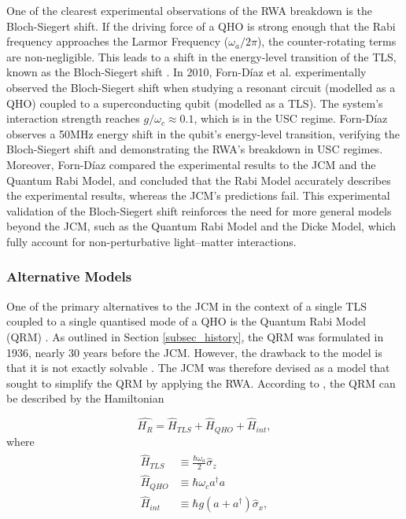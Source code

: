 \documentclass[12pt,a4paper]{article}
\begin{document}
One of the clearest experimental observations of the RWA breakdown is the Bloch-Siegert shift. If the driving force of a QHO is strong enough that the Rabi frequency approaches the Larmor Frequency ($\omega_a/2\pi$), the counter-rotating terms are non-negligible. This leads to a shift in the energy-level transition of the TLS, known as the Bloch-Siegert shift \cite{Context2010-Bloch_Siegert}. In 2010, Forn-D\'iaz et al. experimentally observed the Bloch-Siegert shift when studying a resonant circuit (modelled as a QHO) coupled to a superconducting qubit (modelled as a TLS). The system's interaction strength reaches $g/\omega_c \approx 0.1$, which is in the USC regime. Forn-D\'iaz observes a 50MHz energy shift in the qubit's energy-level transition, verifying the Bloch-Siegert shift and demonstrating the RWA's breakdown in USC regimes. Moreover, Forn-D\'iaz compared the experimental results to the JCM and the Quantum Rabi Model, and concluded that the Rabi Model accurately describes the experimental results, whereas the JCM's predictions fail. This experimental validation of the Bloch-Siegert shift reinforces the need for more general models beyond the JCM, such as the Quantum Rabi Model and the Dicke Model, which fully account for non-perturbative light–matter interactions.


\subsubsection{Alternative Models}

One of the primary alternatives to the JCM in the context of a single TLS coupled to a single quantised mode of a QHO is the Quantum Rabi Model (QRM) \cite{Context1936-Rabi}. As outlined in Section \ref{subsec_history}, the QRM was formulated in 1936, nearly 30 years before the JCM. However, the drawback to the model is that it is not exactly solvable \cite{Hamiltonian2017-Rabi}. The JCM was therefore devised as a model that sought to simplify the QRM by applying the RWA. According to \cite{General2024-JCM_relevance}, the QRM can be described by the Hamiltonian

\begin{equation}
    \hat{H_R} = \hat{H}_{TLS} + \hat{H}_{QHO} + \hat{H}_{int}, 
\end{equation} \label{JC_H}
where 
\begin{align*}
    \begin{aligned}
        \hat{H}_{TLS} &\equiv \frac{\hbar\omega_a}{2}\hat{\sigma}_z \\
        \hat{H}_{QHO} &\equiv \hbar\omega_ca^\dagger a \\
        \hat{H}_{int} &\equiv \hbar g(a + a^\dagger)\hat{\sigma}_{x},
    \end{aligned}
\end{align*}
\end{document}
